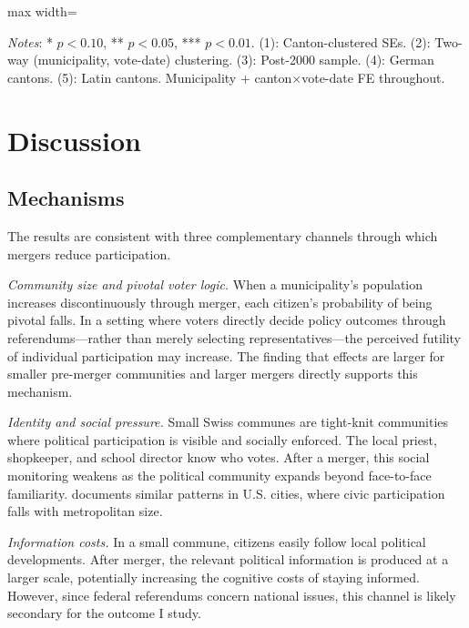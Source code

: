 \documentclass[12pt]{article}
\begin{document}
\begin{table}[H]
\centering
\caption{Robustness Checks}
\label{tab:robustness}
\begin{adjustbox}{max width=\textwidth}

\end{adjustbox}
\vspace{0.3em}
\parbox{\textwidth}{\footnotesize \textit{Notes}: * $p<0.10$, ** $p<0.05$, *** $p<0.01$. (1): Canton-clustered SEs. (2): Two-way (municipality, vote-date) clustering. (3): Post-2000 sample. (4): German cantons. (5): Latin cantons. Municipality + canton$\times$vote-date FE throughout.}
\end{table}


\section{Discussion}

\subsection{Mechanisms}

The results are consistent with three complementary channels through which mergers reduce participation.

\textit{Community size and pivotal voter logic.} When a municipality's population increases discontinuously through merger, each citizen's probability of being pivotal falls. In a setting where voters directly decide policy outcomes through referendums---rather than merely selecting representatives---the perceived futility of individual participation may increase. The finding that effects are larger for smaller pre-merger communities and larger mergers directly supports this mechanism.

\textit{Identity and social pressure.} Small Swiss communes are tight-knit communities where political participation is visible and socially enforced. The local priest, shopkeeper, and school director know who votes. After a merger, this social monitoring weakens as the political community expands beyond face-to-face familiarity. \citet{oliver2000city} documents similar patterns in U.S. cities, where civic participation falls with metropolitan size.

\textit{Information costs.} In a small commune, citizens easily follow local political developments. After merger, the relevant political information is produced at a larger scale, potentially increasing the cognitive costs of staying informed. However, since federal referendums concern national issues, this channel is likely secondary for the outcome I study.
\end{document}
